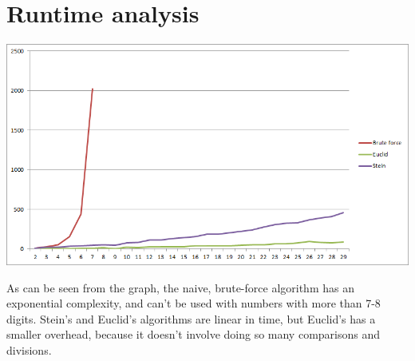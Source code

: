 \documentclass[a4paper,12pt]{article}
\begin{document}
	
\section{Runtime analysis}

\includegraphics{graph.png}

As can be seen from the graph, the naive, brute-force algorithm has an exponential complexity, and can't be used with numbers with more than 7-8 digits. Stein's and Euclid's algorithms are linear in time, but Euclid's has a smaller overhead, because it doesn't involve doing so many comparisons and divisions. 
\end{document}
